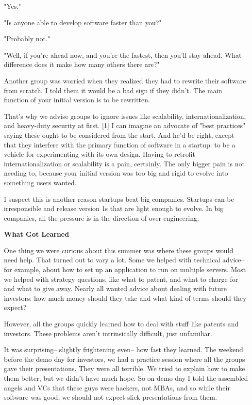 "Yes."

"Is anyone able to develop software faster than you?"

"Probably not."

"Well, if you're ahead now, and you're the fastest, then you'll
stay ahead.  What difference does it make how many others there
are?"

Another group was worried when they realized they had to rewrite
their software from scratch.  I told them it would be a bad sign
if they didn't.  The main function of your initial version is to  
be rewritten.

That's why we advise groups to ignore issues like scalability,
internationalization, and heavy-duty security at first. [1] I can
imagine an advocate of "best practices" saying these ought to be
considered from the start.  And he'd be right, except that they
interfere with the primary function of software in a startup: to  
be a vehicle for experimenting with its own design.  Having to
retrofit internationalization or scalability is a pain, certainly.  
The only bigger pain is not needing to, because your initial version
was too big and rigid to evolve into something users wanted.

I suspect this is another reason startups beat big companies.
Startups can be irresponsible and release version 1s that are light
enough to evolve.  In big companies, all the pressure is in the   
direction of over-engineering.

\textbf{What Got Learned}

One thing we were curious about this summer was where these groups  
would need help.  That turned out to vary a lot.  Some we helped
with technical advice-- for example, about how to set up an application
to run on multiple servers.  Most we helped with strategy questions,
like what to patent, and what to charge for and what to give away.
Nearly all wanted advice about dealing with future investors: how  
much money should they take and what kind of terms should they
expect?

However, all the groups quickly learned how to deal with stuff like
patents and investors.  These problems aren't intrinsically difficult,
just unfamiliar.

It was surprising-- slightly frightening even-- how fast they
learned.  The weekend before the demo day for investors, we had a  
practice session where all the groups gave their presentations.  
They were all terrible.  We tried to explain how to make them better,
but we didn't have much hope.  So on demo day I told the assembled
angels and VCs that these guys were hackers, not MBAs, and so while
their software was good, we should not expect slick presentations 
from them.

